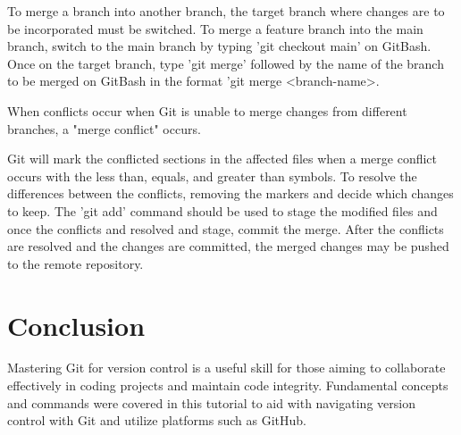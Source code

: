 \documentclass[10pt,twocolumn]{article}
\begin{document}
To merge a branch into another branch, the target branch where changes are to be incorporated must be switched. To merge a feature branch into the main branch, switch to the main branch by typing 'git checkout main' on GitBash. Once on the target branch, type 'git merge' followed by the name of the branch to be merged on GitBash in the format 'git merge <branch-name>.

When conflicts occur when Git is unable to merge changes from different branches, a "merge conflict" occurs.

Git will mark the conflicted sections in the affected files when a merge conflict occurs with the less than, equals, and greater than symbols. To resolve the differences between the conflicts, removing the markers and decide which changes to keep. The 'git add' command should be used to stage the modified files and once the conflicts and resolved and stage, commit the merge. After the conflicts are resolved and the changes are committed, the merged changes may be pushed to the remote repository. 
\section{Conclusion}
Mastering Git for version control is a useful skill for those aiming to collaborate effectively in coding projects and maintain code integrity. Fundamental concepts and commands were covered in this tutorial to aid with navigating version control with Git and utilize platforms such as GitHub. 










\printbibliography
\end{document}
